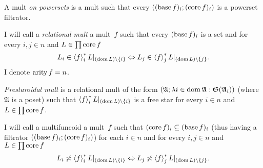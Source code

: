 \begin{defn}
A mult \emph{on powersets} is a mult such
that every $((\operatorname{base} f)_{i};(\operatorname{core} f)_{i})$ is a powerset filtrator.
\end{defn}

\begin{defn}
I will call a \emph{relational mult} a mult~$f$
such that every $(\operatorname{base} f)_{i}$ is a set and for every $i,j\in n$
and $L\in\prod\operatorname{core} f$ 
\[
L_{i}\in\left\langle f\right\rangle ^{\ast}_{i}L|_{(\operatorname{dom} L)\setminus\{i\}}\Leftrightarrow L_{j}\in\left\langle f\right\rangle ^{\ast}_{j}L|_{(\operatorname{dom} L)\setminus\{j\}}.
\]
I denote $\operatorname{arity} f=n$.
\end{defn}

\begin{defn}
\emph{Prestaroidal mult} is a relational mult of the form $(\mathfrak{A};\lambda i\in\operatorname{dom}\mathfrak{A}:\mathfrak{S}(\mathfrak{A}_{i}))$
(where $\mathfrak{A}$ is a poset) such that $\left\langle f\right\rangle ^{\ast}_{i}L|_{(\operatorname{dom} L)\setminus\{i\}}$
is a free star for every $i\in n$ and $L\in\prod\operatorname{core} f$.
\end{defn}

\begin{defn}
I will call a multifuncoid a mult~$f$ such
that $(\operatorname{core} f)_{i}\subseteq(\operatorname{base} f)_{i}$ (thus having a filtrator
$((\operatorname{base} f)_{i};(\operatorname{core} f)_{i})$) for each $i\in n$ and for every
$i,j\in n$ and $L\in\prod\operatorname{core} f$ 
\begin{equation}
L_{i}\not\asymp\left\langle f\right\rangle ^{\ast}_{i}L|_{(\operatorname{dom} L)\setminus\{i\}}\Leftrightarrow L_{j}\not\asymp\left\langle f\right\rangle ^{\ast}_{j}L|_{(\operatorname{dom} L)\setminus\{j\}}.\label{alpha-cond}
\end{equation}

\end{defn}


